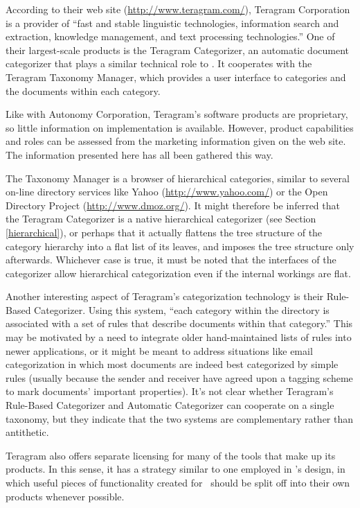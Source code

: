 According to their web site (\url{http://www.teragram.com/}), Teragram
Corporation is a provider of ``fast and stable linguistic
technologies, information search and extraction, knowledge management,
and text processing technologies.''  One of their largest-scale
products is the Teragram Categorizer, an automatic document
categorizer that plays a similar technical role to \aicat.
It cooperates with the Teragram Taxonomy Manager, which provides a
user interface to categories and the documents within each category.

Like with Autonomy Corporation, Teragram's software products are proprietary, so little
information on implementation is available.  However, product
capabilities and roles can be assessed from the marketing information
given on the web site.  The information presented here has all been
gathered this way.

The Taxonomy Manager is a browser of hierarchical categories, similar
to several on-line directory services like Yahoo
(\url{http://www.yahoo.com/}) or the Open Directory Project
(\url{http://www.dmoz.org/}).  It might therefore be inferred that the
Teragram Categorizer is a native hierarchical categorizer (see Section
\ref{hierarchical}), or perhaps that it
actually flattens the tree structure of the category
hierarchy into a flat list of its leaves, and imposes the tree
structure only afterwards.  Whichever case is true, it must be noted
that the interfaces of the categorizer allow hierarchical
categorization even if the internal workings are flat.

Another interesting aspect of Teragram's categorization technology is
their Rule-Based Categorizer.  Using this system, ``each category
within the directory is associated with a set of rules that describe
documents within that category.''  This may be motivated by a need to
integrate older hand-maintained lists of rules into newer
applications, or it might be meant to address situations like email
categorization in which most documents are indeed best categorized by
simple rules (usually because the sender and receiver have agreed upon
a tagging scheme to mark documents' important properties).  It's not
clear whether Teragram's Rule-Based Categorizer and Automatic
Categorizer can cooperate on a single taxonomy, but they indicate that
the two systems are complementary rather than antithetic.

Teragram also offers separate licensing for many of the tools that
make up its products.  In this sense, it has a strategy similar to one
employed in \aicat's design, in which useful pieces of
functionality created for \aicat\ should be split off into
their own products whenever possible.


